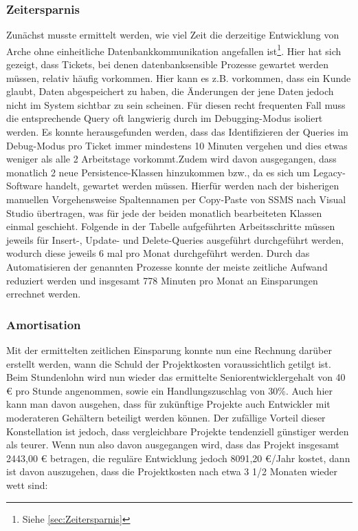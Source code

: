 \documentclass[11pt,toc=sectionentrywithoutdots, 
headheight=44pt, headings=optiontoheadandtoc, hyperfootnotes=false, hypertexnames=false]{scrartcl}
\newcommand\extendedref[1]{Siehe \ref{#1}}
\begin{document}
\subsubsection{Zeitersparnis}
Zunächst musste ermittelt werden, wie viel Zeit die derzeitige Entwicklung von Arche ohne einheitliche Datenbankkommunikation angefallen ist\footnote{\extendedref{sec:Zeitersparnis}}. Hier hat sich gezeigt, dass Tickets, bei denen datenbanksensible Prozesse gewartet werden müssen, relativ häufig vorkommen. Hier kann es z.B. vorkommen, dass ein Kunde glaubt, Daten abgespeichert zu haben, die Änderungen der jene Daten jedoch nicht im System sichtbar zu sein scheinen. Für diesen recht frequenten Fall muss die entsprechende Query oft langwierig durch im Debugging-Modus isoliert werden. Es konnte herausgefunden werden, dass das Identifizieren der Queries im Debug-Modus pro Ticket immer mindestens 10 Minuten vergehen und dies etwas weniger als alle 2 Arbeitstage vorkommt.\newline\newline Zudem wird davon ausgegangen, dass monatlich 2 neue Persistence-Klassen hinzukommen bzw., da es sich um Legacy-Software handelt, gewartet werden müssen. Hierfür werden nach der bisherigen manuellen Vorgehensweise Spaltennamen per Copy-Paste von SSMS nach Visual Studio übertragen, was für jede der beiden monatlich bearbeiteten Klassen einmal geschieht. Folgende in der Tabelle aufgeführten Arbeitsschritte müssen jeweils für Insert-, Update- und Delete-Queries ausgeführt durchgeführt werden, wodurch diese jeweils 6 mal pro Monat durchgeführt werden. Durch das Automatisieren der genannten Prozesse konnte der meiste zeitliche Aufwand reduziert werden und insgesamt 778 Minuten pro Monat an Einsparungen errechnet werden.

\subsubsection{Amortisation}
Mit der ermittelten zeitlichen Einsparung konnte nun eine Rechnung darüber erstellt werden, wann die Schuld der Projektkosten voraussichtlich getilgt ist. Beim Stundenlohn wird nun wieder das ermittelte Seniorentwicklergehalt von 40 € pro Stunde angenommen, sowie ein Handlungszuschlag von 30\%. Auch hier kann man davon ausgehen, dass für zukünftige Projekte auch Entwickler mit moderateren Gehältern beteiligt werden können. Der zufällige Vorteil dieser Konstellation ist jedoch, dass vergleichbare Projekte tendenziell günstiger werden als teurer. Wenn nun also davon ausgegangen wird, dass das Projekt insgesamt 2443,00 € betragen, die reguläre Entwicklung jedoch 8091,20 €/Jahr kostet, dann ist davon auszugehen, dass die Projektkosten nach etwa 3 1/2 Monaten wieder wett sind:\clearpage
\end{document}
